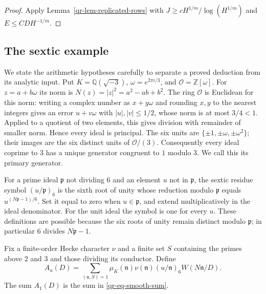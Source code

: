 \begin{proof}
Apply Lemma~\ref{qr-lem-replicated-rows} with
$J\geq cH^{1/m}/\log(H^{1/m})$ and $E\leq CDH^{-1/m}$.
\end{proof}

\subsection{The sextic example}
\label{qr-subsec-sextic}

We state the arithmetic hypotheses carefully to separate a proved
deduction from its analytic input. Put
$K=\mathbb Q(\sqrt{-3})$, $\omega=e^{2\pi i/3}$, and
$\mathcal O=\mathbb Z[\omega]$. For $z=a+b\omega$ its norm is
$N(z)=|z|^2=a^2-ab+b^2$.
The ring $\mathcal O$ is Euclidean for this norm: writing a complex
number as $x+y\omega$ and rounding $x,y$ to the nearest integers gives
an error $u+v\omega$ with $|u|,|v|\leq1/2$, whose norm is at most
$3/4<1$. Applied to a quotient of two elements, this gives division
with remainder of smaller norm. Hence every ideal is principal.
The six units are $\{\pm1,\pm\omega,\pm\omega^2\}$; their images are
the six distinct units of $\mathcal O/(3)$. Consequently every ideal
coprime to $3$ has a unique generator congruent to $1$ modulo $3$.
We call this its primary generator.

For a prime ideal $\mathfrak p$ not dividing $6$ and an element $u$
not in $\mathfrak p$, the sextic residue symbol
$(u/\mathfrak p)_6$ is the sixth root of unity whose reduction modulo
$\mathfrak p$ equals $u^{(N\mathfrak p-1)/6}$. Set it equal to zero
when $u\in\mathfrak p$, and extend multiplicatively in the ideal
denominator. For the unit ideal the symbol is one for every $u$.
These definitions are possible because the six roots of unity remain
distinct modulo $\mathfrak p$; in particular $6$ divides
$N\mathfrak p-1$.

Fix a finite-order Hecke character $\nu$ and a finite set $S$ containing
the primes above $2$ and $3$ and those dividing its conductor. Define
\begin{equation}\label{qr-eq-sextic-family}
 A_u(D)=\sum_{(\mathfrak n,S)=1}
     \mu_K(\mathfrak n)\nu(\mathfrak n)
     (u/\mathfrak n)_6 W(N\mathfrak n/D).
\end{equation}
The sum $A_1(D)$ is the sum in \eqref{qr-eq-smooth-sum}.

